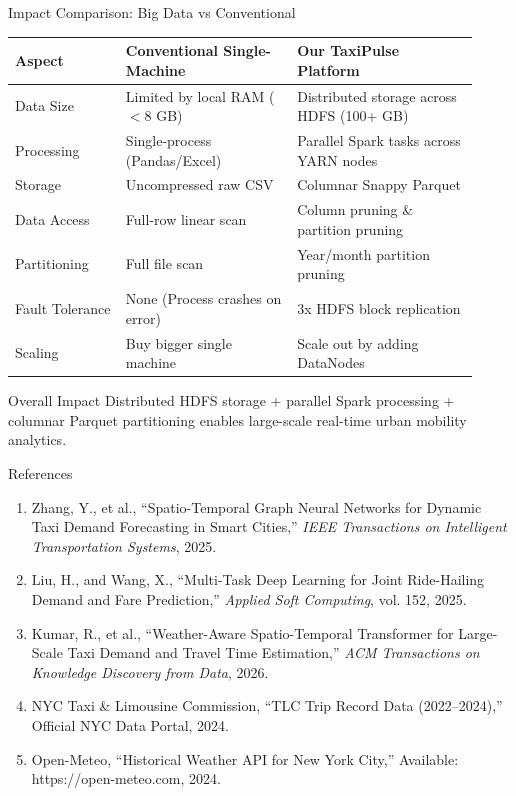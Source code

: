 \documentclass[aspectratio=169]{beamer}
\begin{document}
\begin{frame}{Impact Comparison: Big Data vs Conventional}
  \small
  \begin{tabular}{p{0.22\linewidth} p{0.34\linewidth} p{0.36\linewidth}}
    \toprule
    \textbf{Aspect} & \textbf{Conventional Single-Machine} & \textbf{Our TaxiPulse Platform} \\
    \midrule
    Data Size & Limited by local RAM ($<$8 GB) & Distributed storage across HDFS (100+ GB) \\
    Processing & Single-process (Pandas/Excel) & Parallel Spark tasks across YARN nodes \\
    Storage & Uncompressed raw CSV & Columnar Snappy Parquet \\
    Data Access & Full-row linear scan & Column pruning \& partition pruning \\
    Partitioning & Full file scan & Year/month partition pruning \\
    Fault Tolerance & None (Process crashes on error) & 3x HDFS block replication \\
    Scaling & Buy bigger single machine & Scale out by adding DataNodes \\
    \bottomrule
  \end{tabular}
  \vspace{6pt}
  \begin{block}{Overall Impact}
    Distributed HDFS storage + parallel Spark processing + columnar Parquet partitioning enables large-scale real-time urban mobility analytics.
  \end{block}
\end{frame}

\begin{frame}{References}
  \small
  \begin{enumerate}
    \item Zhang, Y., et al., ``Spatio-Temporal Graph Neural Networks for Dynamic Taxi Demand Forecasting in Smart Cities,'' \emph{IEEE Transactions on Intelligent Transportation Systems}, 2025.
    \item Liu, H., and Wang, X., ``Multi-Task Deep Learning for Joint Ride-Hailing Demand and Fare Prediction,'' \emph{Applied Soft Computing}, vol. 152, 2025.
    \item Kumar, R., et al., ``Weather-Aware Spatio-Temporal Transformer for Large-Scale Taxi Demand and Travel Time Estimation,'' \emph{ACM Transactions on Knowledge Discovery from Data}, 2026.
    \item NYC Taxi \& Limousine Commission, ``TLC Trip Record Data (2022--2024),'' Official NYC Data Portal, 2024.
    \item Open-Meteo, ``Historical Weather API for New York City,'' Available: https://open-meteo.com, 2024.
  \end{enumerate}
\end{frame}
\end{document}
